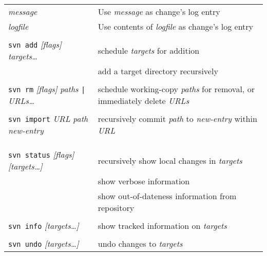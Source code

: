 \documentclass{report}
\begin{document}
\begin{tabular}{ll}
\hspace{0.5in}{\tt -m} {\sl message}		&
Use {\sl message} as change's log entry		 \\

\hspace{0.5in}{\tt -F} {\sl logfile}		&
Use contents of {\sl logfile} as change's log entry		 \\

\\
{\tt svn add} {\sl [flags]} {\sl targets\dots}    &
schedule {\sl targets} for addition		         \\

\hspace{0.5in}{\tt --recursive}		&
add a target directory recursively	 \\

\\
{\tt svn rm} {\sl [flags]} {\sl paths} \verb!|! {\sl URLs\dots}	&
schedule working-copy {\sl paths} for removal,
or immediately delete {\sl URLs}	 \\

\\
{\tt svn import} {\sl URL} {\sl path} {\sl new-entry}	&
recursively commit {\sl path} to {\sl new-entry} within {\sl URL} \\

\\
\\
\vspace{0.1in} \hspace{-0.1in}{\bf\Large Working Copy Maintenance} \\

{\tt svn status} {\sl [flags]} {\sl [targets\dots]}	&
recursively show local changes in {\sl targets}  \\

\hspace{0.5in}{\tt -v}		&
show verbose information		  \\

\hspace{0.5in}{\tt -u}		&
show out-of-dateness information from repository		  \\

\\
{\tt svn info} {\sl [targets\dots]}	&
show tracked information on {\sl targets}   \\

\\
{\tt svn undo} {\sl [targets\dots]}	&
undo changes to {\sl targets}   \\


\end{tabular}
\end{document}
